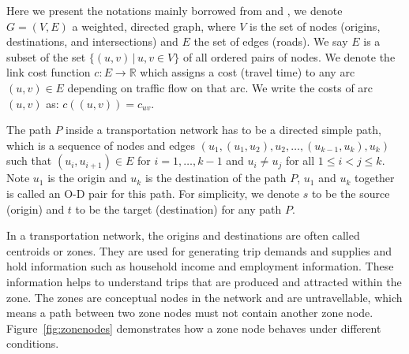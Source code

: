 Here we present the notations mainly borrowed from \citet{Cormen} and \citet{Klunder},
we denote $ G = ( V, E ) $ a weighted, directed graph,
where $ V $ is the set of nodes (origins, destinations, and intersections)
and $ E $ the set of edges (roads).
We say $ E $ is a subset of the set $ \{ (u, v)\, | \, u, v \in V \} $ of all ordered pairs of nodes.
We denote the link cost function $ c : E \rightarrow \mathbb{R} $ which assigns a cost (travel time) to any arc $ (u,v) \in E $ depending on traffic flow on that arc.
We write the costs of arc $(u, v)$ as: $ c((u, v)) = c_{uv} $.

The path $P$ inside a transportation network has to be a directed simple path, 
which is a sequence of nodes and edges $ (u_1, (u_1, u_2), u_2, \ldots , (u_{k-1}, u_k), u_k ) $
such that $ (u_i, u_{i+1}) \in E$ for $i = 1,\ldots,k-1$ and $u_i \neq u_j$ for all $ 1 \leq i < j \leq k$.
Note $u_1$ is the origin and $u_k$ is the destination of the path $P$, $u_1$ and $u_k$ together is called an O-D pair for this path.
For simplicity, we denote $s$ to be the source (origin) and $t$ to be the target (destination) for any path $P$.

In a transportation network,
the origins and destinations are often called centroids or zones.
They are used for generating trip demands and supplies
and hold information such as household income and employment information.
These information helps to understand trips that are produced and attracted within the zone.
The zones are conceptual nodes in the network and are untravellable,
which means a path between two zone nodes must not contain another zone node.
Figure~\ref{fig:zonenodes} demonstrates how a zone node behaves under different conditions.


